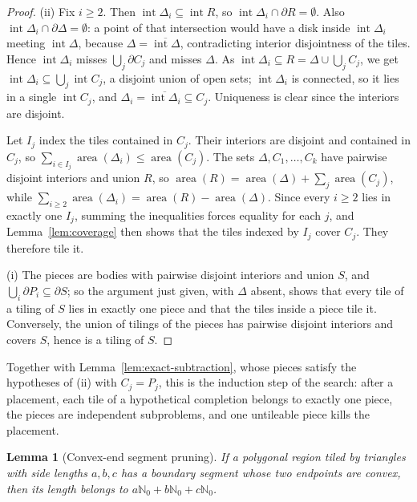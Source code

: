 \documentclass[11pt]{amsart}
\newtheorem{lemma}[theorem]{Lemma}
\theoremstyle{definition}
\theoremstyle{remark}
\newcommand{\Nzero}{\mathbb N_0}
\begin{document}
\begin{proof}
(ii)  Fix $i\ge2$.  Then $\operatorname{int}\Delta_i\subseteq
\operatorname{int}R$, so $\operatorname{int}\Delta_i\cap\partial R=
\emptyset$.  Also $\operatorname{int}\Delta_i\cap\partial\Delta=\emptyset$:
a point of that intersection would have a disk inside
$\operatorname{int}\Delta_i$ meeting $\operatorname{int}\Delta$, because
$\Delta=\overline{\operatorname{int}\Delta}$, contradicting interior
disjointness of the tiles.  Hence $\operatorname{int}\Delta_i$ misses
$\bigcup_j\partial C_j$ and misses $\Delta$.  As
$\operatorname{int}\Delta_i\subseteq R=\Delta\cup\bigcup_jC_j$, we get
$\operatorname{int}\Delta_i\subseteq\bigcup_j\operatorname{int}C_j$, a
disjoint union of open sets; $\operatorname{int}\Delta_i$ is connected, so it
lies in a single $\operatorname{int}C_j$, and
$\Delta_i=\overline{\operatorname{int}\Delta_i}\subseteq C_j$.  Uniqueness is
clear since the interiors are disjoint.

Let $I_j$ index the tiles contained in $C_j$.  Their interiors are disjoint
and contained in $C_j$, so $\sum_{i\in I_j}\operatorname{area}(\Delta_i)\le
\operatorname{area}(C_j)$.  The sets $\Delta,C_1,\dots,C_k$ have pairwise
disjoint interiors and union $R$, so
$\operatorname{area}(R)=\operatorname{area}(\Delta)+\sum_j
\operatorname{area}(C_j)$, while
$\sum_{i\ge2}\operatorname{area}(\Delta_i)=\operatorname{area}(R)-
\operatorname{area}(\Delta)$.  Since every $i\ge2$ lies in exactly one
$I_j$, summing the inequalities forces equality for each $j$, and
Lemma~\ref{lem:coverage} then shows that the tiles indexed by $I_j$ cover
$C_j$.  They therefore tile it.

(i)  The pieces are bodies with pairwise disjoint interiors and union $S$,
and $\bigcup_i\partial P_i\subseteq\partial S$; so the argument just given,
with $\Delta$ absent, shows that every tile of a tiling of $S$ lies in
exactly one piece and that the tiles inside a piece tile it.  Conversely, the
union of tilings of the pieces has pairwise disjoint interiors and covers
$S$, hence is a tiling of $S$.
\end{proof}

Together with Lemma~\ref{lem:exact-subtraction}, whose pieces satisfy the
hypotheses of (ii) with $C_j=P_j$, this is the induction step of the search:
after a placement, each tile of a hypothetical completion belongs to exactly
one piece, the pieces are independent subproblems, and one untileable piece
kills the placement.

\begin{lemma}[Convex-end segment pruning]\label{lem:convex-segment}
If a polygonal region tiled by triangles with side lengths $a,b,c$ has a
boundary segment whose two endpoints are convex, then its length belongs to
$a\Nzero+b\Nzero+c\Nzero$.
\end{lemma}
\end{document}
